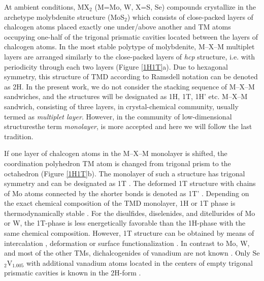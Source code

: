 \documentclass[a4paperm]{article}
\begin{document}
At ambient conditions, MX$_2$ (M=Mo, W, X=S, Se) compounds crystallize in the archetype molybdenite structure (MoS$_2$) which consists of close-packed layers of chalcogen atoms placed exactly one under/above another and TM atoms occupying one-half of the trigonal prismatic cavities located between the layers of chalcogen atoms. 
In the most stable polytype of molybdenite, M--X--M multiplet layers are arranged similarly to the close-packed layers of {\it hcp} structure, i.e. with periodicity through each two layers (Figure \ref{1H1T}a).
Due to hexagonal symmetry, this structure of TMD according to Ramsdell notation can be denoted as 2H.
In the present work, we do not consider the stacking sequence of M--X--M sandwiches, and the structures will be designated as 1H, 1T, 1H' etc.
M--X--M sandwich, consisting of three layers, in crystal-chemical community, usually termed as {\it multiplet layer}.
However, in the community of low-dimensional structuresthe term {\it monolayer}, is more accepted and here we will follow the last tradition. 

If one layer of chalcogen atoms in the M--X--M monolayer is shifted, the coordination polyhedron TM atom is changed from trigonal prism to the octahedron (Figure \ref{1H1T}b).
The monolayer of such a structure has trigonal symmetry and can be designated as 1T \cite{huang2020recent}. 
The deformed 1T structure with chains of Mo atoms connected by the shorter bonds is denoted as 1T' \cite{huang2020recent}.
Depending on the exact chemical composition of the TMD monolayer, 1H or 1T phase is thermodynamically stable \cite{ataca2012stable}. 
For the disulfides, diselenides, and ditellurides of Mo or W, the  1T-phase is less energetically favorable than the 1H-phase with the same chemical composition. 
However, 1T structure can be obtained by means of intercalation \cite{kan2014structures, wang2014atomic}, deformation \cite{duerloo2014structural} or surface functionalization \cite{tang2015stabilization, voiry2015covalent}. 
In contrast to Mo, W, and most of the other TMs, dichalcogenides of vanadium are not known \cite{murphy1977preparation, le1979elaboration}. 
Only Se$_2$V$_{1.005}$ with additional vanadium atoms located in the centers of empty trigonal prismatic cavities is known in the 2H-form \cite{rigoult1982}.
\end{document}

